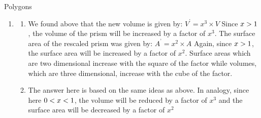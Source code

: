 \begin{exercises}{Polygons}
{\begin{mdframed}[linewidth=4, leftmargin=40, rightmargin=40]
\begin{exercise}
\begin{enumerate}[noitemsep, label=\textbf{Step} \textbf{\arabic*}. ]
        
        \label{m39357*id64062}The new surface area of the prism will be given by:\par 
        \label{m39357*id64066}\nopagebreak\noindent{}
          
    \begin{equation}
    \begin{array}{ccc}\hfill {A}^{\text{'}}& =& 2\ensuremath{\times}\left({L}^{\text{'}}\ensuremath{\times}{b}^{\text{'}}+{L}^{\text{'}}\ensuremath{\times}{h}^{\text{'}}+{b}^{\text{'}}\ensuremath{\times}{h}^{\text{'}}\right)\hfill \\ & =& 2\ensuremath{\times}\left(x\ensuremath{\times}L\ensuremath{\times}x\ensuremath{\times}b+x\ensuremath{\times}L\ensuremath{\times}x\ensuremath{\times}h+x\ensuremath{\times}b\ensuremath{\times}x\ensuremath{\times}h\right)\hfill \\ & =& {x}^{2}\ensuremath{\times}2\ensuremath{\times}\left(L\ensuremath{\times}b+L\ensuremath{\times}h+b\ensuremath{\times}h\right)\hfill \\ & =& {x}^{2}\ensuremath{\times}A\hfill \end{array}\tag{13.23}
      \end{equation}
    
        
        \item  
        \label{m39357*id64313}\begin{enumerate}[noitemsep, label=\textbf{\alph*}. ] 
            \leftskip=20pt\rightskip=\leftskip\label{m39357*uid23}\item We found above that the new volume is given by:
${V}^{\text{'}}={x}^{3}\ensuremath{\times}V$
Since $x>{}1$, the volume of the prism will be increased by a factor of ${x}^{3}$.
The surface area of the rescaled prism was given by:
${A}^{\text{'}}={x}^{2}\ensuremath{\times}A$
Again, since $x>{}1$, the surface area will be increased by a factor of ${x}^{2}$. Surface areas which are two dimensional increase with the square of the factor while volumes, which are three dimensional, increase with the cube of the factor.
\label{m39357*uid24}\item The answer here is based on the same ideas as above.
In analogy, since here $0<{}x<{}1$, the volume will be reduced by a factor of ${x}^{3}$ and the surface area will be decreased by a factor of ${x}^{2}$\end{enumerate}
        
        
        \end{enumerate}
         


\end{exercise}
\end{mdframed}}
\end{exercises}
